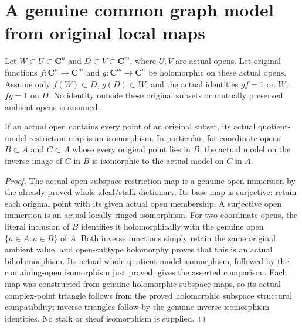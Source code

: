 \section{A genuine common graph model from original local maps}

Let $W\subset U\subset\mathbf C^n$ and $D\subset V\subset\mathbf C^m$,
where $U,V$ are actual opens. Let original functions $f:\mathbf C^n\to
\mathbf C^m$ and $g:\mathbf C^m\to\mathbf C^n$ be holomorphic on these
actual opens. Assume only $f(W)\subset D$, $g(D)\subset W$, and the
actual identities $gf=1$ on $W$, $fg=1$ on $D$. No identity outside
these original subsets or mutually preserved ambient opens is assumed.

\begin{theorem}
\label{hir:actual-local-common-graph-containing-open-iso}
\leanok
If an actual open contains every point of an original subset, its actual
quotient-model restriction map is an isomorphism. In particular, for
coordinate opens $B\subset A$ and $C\subset A$ whose every original point
lies in $B$, the actual model on the inverse image of $C$ in $B$ is
isomorphic to the actual model on $C$ in $A$.
\end{theorem}
\begin{proof}
The actual open-subspace restriction map is a genuine open immersion by
the already proved whole-ideal/stalk dictionary. Its base map is
surjective: retain each original point with its given actual open
membership. A surjective open immersion is an actual locally ringed
isomorphism. For two coordinate opens, the literal inclusion of $B$
identifies it holomorphically with the genuine open
$\{a\in A:a\in B\}$ of $A$. Both inverse functions simply retain the
same original ambient value, and open-subtype holomorphy proves that this
is an actual biholomorphism. Its actual whole quotient-model isomorphism,
followed by the containing-open isomorphism just proved, gives the
asserted comparison. Each map was constructed from genuine holomorphic
subspace maps, so its actual complex-point triangle follows from the proved
holomorphic subspace structural compatibility; inverse triangles follow
by the genuine inverse isomorphism identities. No stalk or sheaf
isomorphism is supplied.
\end{proof}

